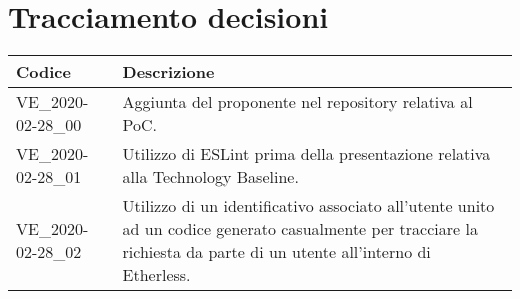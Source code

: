 \section{Tracciamento decisioni}
\renewcommand{\arraystretch}{1.8}

\begin{longtable}{|p{5cm}|p{8cm}|}
	\hline
	
	\rowcolor{header}
	\textbf{Codice} & \textbf{Descrizione} \\
	
	\hline
	
	VE\_2020-02-28\_00 & Aggiunta del proponente nel repository relativa al PoC.\\
	VE\_2020-02-28\_01 & Utilizzo di ESLint prima della presentazione relativa alla Technology Baseline. \\
	VE\_2020-02-28\_02 & Utilizzo di un identificativo associato all'utente unito ad un codice generato casualmente per tracciare la richiesta da parte di un utente all'interno di Etherless. \\
	
	\hline
\end{longtable}